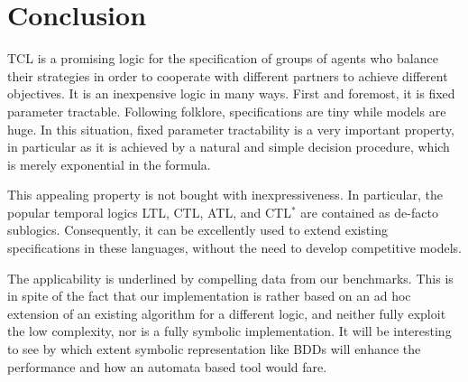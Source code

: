 \documentclass{llncs}
\begin{document}
\section{Conclusion \label{sec.conc}}

TCL is a promising logic for the specification of groups of agents 
who balance their strategies in order to cooperate with different partners to achieve different objectives.
It is an inexpensive logic in many ways.
First and foremost, it is fixed parameter tractable.
Following folklore, specifications are tiny while models are huge.
In this situation, fixed parameter tractability is a very important property, in particular as it is achieved by a natural and simple decision procedure, which is merely exponential in the formula.

This appealing property is not bought with inexpressiveness.
In particular, the popular temporal logics LTL, CTL, ATL, and CTL$^*$ are contained as de-facto sublogics.
Consequently, it can be excellently used to extend existing specifications in these languages, without the need to develop competitive models.

The applicability is underlined by compelling data from our benchmarks.
This is in spite of the fact that our implementation is rather based on 
an ad hoc extension of an existing algorithm for a different logic, and neither fully exploit the low complexity, nor is a fully symbolic implementation.
It will be interesting to see by which extent symbolic representation like BDDs will enhance the performance and how an automata based tool would fare.
\end{document}
